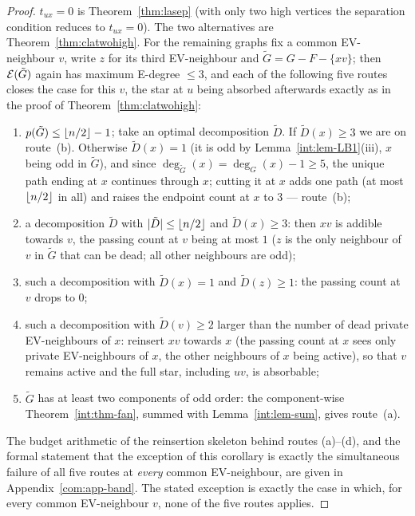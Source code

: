\begin{proof}
$t_{ux}=0$ is Theorem~\ref{thm:lasep} (with only two high vertices the
separation condition reduces to $t_{ux}=0$). The two alternatives are
Theorem~\ref{thm:clatwohigh}. For the remaining graphs fix a common
EV-neighbour $v$, write $z$ for its third EV-neighbour and
$\tilde G=G-F-\{xv\}$; then $\mathcal{E}(\tilde G)$ again has maximum E-degree
$\le3$, and each of the following five routes closes the case for this
$v$, the star at $u$ being absorbed afterwards exactly as in the proof of
Theorem~\ref{thm:clatwohigh}:
\begin{enumerate}[label={\rm(\alph*)},leftmargin=2em]
\item $p(\tilde G)\le\left\lfloor n/2 \right\rfloor-1$; take an optimal decomposition
$\tilde D$. If $\tilde D(x)\ge3$ we are on route~(b). Otherwise
$\tilde D(x)=1$ (it is odd by Lemma~\ref{int:lem-LB1}(iii), $x$ being odd in
$\tilde G$), and since $\deg_{\tilde G}(x)=\deg_G(x)-1\ge5$, the unique
path ending at $x$ continues through $x$; cutting it at $x$ adds one path
(at most $\left\lfloor n/2 \right\rfloor$ in all) and raises the endpoint count at $x$ to $3$
--- route~(b);
\item a decomposition $\tilde D$ with $|\tilde D|\le\left\lfloor n/2 \right\rfloor$ and
$\tilde D(x)\ge3$: then $xv$ is addible towards $v$, the passing count at
$v$ being at most $1$ ($z$ is the only neighbour of $v$ in $\tilde G$ that
can be dead; all other neighbours are odd);
\item such a decomposition with $\tilde D(x)=1$ and $\tilde D(z)\ge1$: the
passing count at $v$ drops to $0$;
\item such a decomposition with $\tilde D(v)\ge2$ larger than the number of
dead private EV-neighbours of $x$: reinsert $xv$ towards $x$ (the passing
count at $x$ sees only private EV-neighbours of $x$, the other neighbours
of $x$ being active), so that $v$ remains active and the full star,
including $uv$, is absorbable;
\item $\tilde G$ has at least two components of odd order: the
component-wise Theorem~\ref{int:thm-fan}, summed with Lemma~\ref{int:lem-sum},
gives route~(a).
\end{enumerate}
The budget arithmetic of the reinsertion skeleton behind routes (a)--(d),
and the formal statement that the exception of this corollary is exactly
the simultaneous failure of all five routes at \emph{every} common
EV-neighbour, are given in Appendix~\ref{com:app-band}.
The stated exception is exactly the case in which, for every common
EV-neighbour $v$, none of the five routes applies.


\end{proof}
